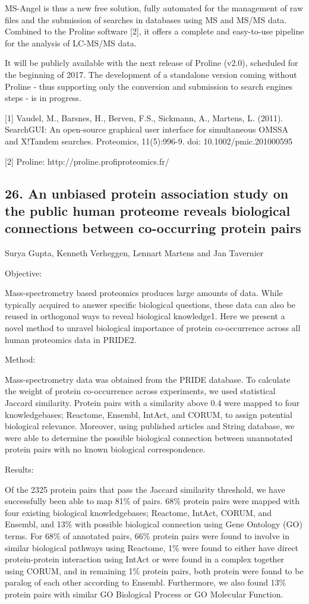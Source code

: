 MS-Angel is thus a new free solution, fully automated for the management of raw files and the submission of searches in databases using MS and MS/MS data. Combined to the Proline software [2], it offers a complete and easy-to-use pipeline for the analysis of LC-MS/MS data.

It will be publicly available with the next release of Proline (v2.0), scheduled for the beginning of 2017. The development of a standalone version coming without Proline - thus supporting only the conversion and submission to search engines steps - is in progress.

[1] Vaudel, M., Barsnes, H., Berven, F.S., Sickmann, A., Martens, L. (2011). SearchGUI: An open-source graphical user interface for simultaneous OMSSA and X!Tandem searches. Proteomics, 11(5):996-9. doi: 10.1002/pmic.201000595

[2] Proline: http://proline.profiproteomics.fr/

\subsection*{\color{eubicRed} 26. An unbiased protein association study on the public human proteome reveals biological connections between co-occurring protein pairs}
{\color{eubicGray}Surya Gupta, Kenneth Verheggen, Lennart Martens and Jan Tavernier}

Objective:

Mass-spectrometry based proteomics produces large amounts of data. While typically acquired to answer specific biological questions, these data can also be reused in orthogonal ways to reveal biological knowledge1. Here we present a novel method to unravel biological importance of protein co-occurrence across all human proteomics data in PRIDE2.


Method:

Mass-spectrometry data was obtained from the PRIDE database. To calculate the weight of protein co-occurrence across experiments, we used statistical Jaccard similarity. Protein pairs with a similarity above 0.4 were mapped to four knowledgebases; Reactome, Ensembl, IntAct, and CORUM, to assign potential biological relevance. Moreover, using published articles and String database, we were able to determine the possible biological connection between unannotated protein pairs with no known biological correspondence.


Results:

Of the 2325 protein pairs that pass the Jaccard similarity threshold, we have successfully been able to map 81\% of pairs. 68\% protein pairs were mapped with four existing biological knowledgebases; Reactome, IntAct, CORUM, and Ensembl, and 13\% with possible biological connection using Gene Ontology (GO) terms. For 68\% of annotated pairs, 66\% protein pairs were found to involve in similar biological pathways using Reactome, 1\% were found to either have direct protein-protein interaction using IntAct or were found in a complex together using CORUM, and in remaining 1\% protein pairs, both protein were found to be paralog of each other according to Ensembl. Furthermore, we also found 13\% protein pairs with similar GO Biological Process or GO Molecular Function.


